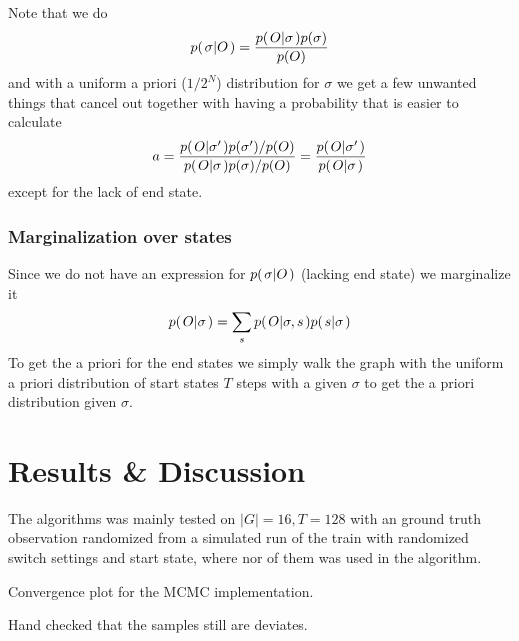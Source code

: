 \documentclass[a4paper,11pt]{kth-mag}
\begin{document}
                Note that we do
                \begin{equation}
                    p{(\left. \sigma \middle\vert O \right.)} = \frac{p{(\left. O \middle\vert \sigma \right.)}p{(\sigma)}}{p{(O)}}
                \end{equation}
                and with a uniform a priori ($1/{2^N}$) distribution for $\sigma$ we get 
                a few unwanted things that cancel out together with having a probability 
                that is easier to calculate
                \begin{equation}
                    a = \frac{
                            p{(\left. O \middle\vert \sigma' \right.)}p{(\sigma')}/p{(O)}
                        }{
                            p{(\left. O \middle\vert \sigma \right.)}p{(\sigma)}/p{(O)}
                        }
                      = \frac{
                            p{(\left. O \middle\vert \sigma' \right.)}
                        }{
                            p{(\left. O \middle\vert \sigma \right.)}
                        }
                \end{equation}
                except for the lack of end state. 

            \subsection{Marginalization over states}
                Since we do not have an expression for $p{(\left. \sigma \middle\vert O \right.)}$ (lacking end state) we marginalize it
                \begin{equation}
                    p{(\left. O \middle\vert \sigma \right.)} = \sum\limits_s p{(\left. O \middle\vert \sigma,s \right.)}p{(\left. s \middle\vert \sigma \right.)}
                \end{equation}
                To get the a priori for the end states we simply walk the graph with the 
                uniform a priori distribution of start states $T$ steps with a given 
                $\sigma$ to get the a priori distribution given $\sigma$.

    \chapter{Results \& Discussion}
        The algorithms was mainly tested on $|G|=16,T=128$ with an ground truth observation 
        randomized from a simulated run of the train with randomized 
        switch settings and start state, where nor of them was used in the algorithm.

        Convergence plot for the MCMC implementation.

        Hand checked that the samples still are deviates.
\end{document}
